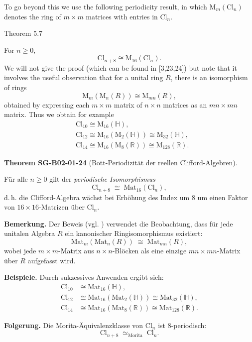 \documentclass[10pt, letterpaper]{article}
\newcommand{\Cl}{\mathrm{Cl}}
\newcommand{\Mat}{\mathrm{Mat}}
\newcommand{\CustomHeading}[3]{%
  \par\medskip\noindent%
  \textbf{#1 #2} \textnormal{(#3)}.\enskip%
}
\newenvironment{THEO}[2]{\begin{unitbox}\CustomHeading{Theorem}{#1}{#2}}{\end{unitbox}}
\begin{document}
To go beyond this we use the following periodicity result, in which $\mathrm{M}_{m}\left(\mathrm{Cl}_{n}\right)$ denotes the ring of $m \times m$ matrices with entries in $\mathrm{Cl}_{n}$.



Theorem 5.7


For $n \geqslant 0$,
$$
\mathrm{Cl}_{n+8} \cong \mathrm{M}_{16}\left(\mathrm{Cl}_{n}\right) .
$$
We will not give the proof (which can be found in [3,23,24]) but note that it involves the useful observation that for a unital ring $R$, there is an isomorphism of rings
$$
\mathrm{M}_{m}\left(\mathrm{M}_{n}(R)\right) \cong \mathrm{M}_{m n}(R),
$$
obtained by expressing each $m \times m$ matrix of $n \times n$ matrices as an $m n \times m n$ matrix. Thus we obtain for example
$$
\begin{aligned}
& \mathrm{Cl}_{10} \cong \mathrm{M}_{16}(\mathbb{H}), \\
& \mathrm{Cl}_{12} \cong \mathrm{M}_{16}\left(\mathrm{M}_{2}(\mathbb{H})\right) \cong \mathrm{M}_{32}(\mathbb{H}), \\
& \mathrm{Cl}_{14} \cong \mathrm{M}_{16}\left(\mathrm{M}_{8}(\mathbb{R})\right) \cong \mathrm{M}_{128}(\mathbb{R}) .
\end{aligned}
$$


\begin{THEO}{SG-B02-01-24}{Bott-Periodizität der reellen Clifford-Algebren}
Für alle \(n\ge 0\) gilt der \emph{periodische Isomorphismus}
\[
\Cl_{n+8}\;\cong\;\Mat_{16}(\Cl_n),
\]
d.\,h. die Clifford-Algebra wächst bei Erhöhung des Index um \(8\)
um einen Faktor von \(16\times16\)-Matrizen über \(\Cl_n\).

\textbf{Bemerkung.}  
Der Beweis (vgl. \cite{ABS64,LawsonMichelsohn89,Karoubi68})
verwendet die Beobachtung, dass für jede unitalen Algebra \(R\)
ein kanonischer Ringisomorphismus existiert:
\[
\Mat_m(\Mat_n(R))\;\cong\;\Mat_{mn}(R),
\]
wobei jede \(m\times m\)-Matrix aus \(n\times n\)-Blöcken als eine
einzige \(mn\times mn\)-Matrix über \(R\) aufgefasst wird.

\textbf{Beispiele.}  Durch sukzessives Anwenden ergibt sich:
\[
\begin{aligned}
\mathrm{Cl}_{10} &\cong \mathrm{Mat}_{16}(\mathbb{H}),\\
\mathrm{Cl}_{12} &\cong \mathrm{Mat}_{16}(\mathrm{Mat}_{2}(\mathbb{H})) \cong \mathrm{Mat}_{32}(\mathbb{H}),\\
\mathrm{Cl}_{14} &\cong \mathrm{Mat}_{16}(\mathrm{Mat}_{8}(\mathbb{R})) \cong \mathrm{Mat}_{128}(\mathbb{R}).
\end{aligned}
\]

\textbf{Folgerung.}
Die Morita-Äquivalenzklasse von \(\Cl_n\) ist \(8\)-periodisch:
\[
\Cl_{n+8}\;\simeq_{\text{Morita}}\;\Cl_n.
\]
\end{THEO}
\end{document}
